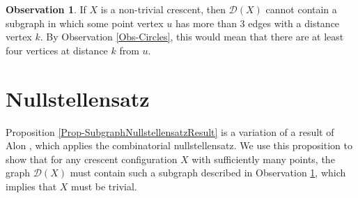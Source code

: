 \documentclass[12pt]{article}
\theoremstyle{definition}
\newtheorem{obs}{Observation}
\begin{document}
	\begin{obs}\label{Obs-BadSubgraph}
		If $X$ is a non-trivial crescent, then $\mathcal{D}(X)$ cannot contain a subgraph in which some point vertex $u$ has more than $3$ edges with a distance vertex $k$.  By Observation \ref{Obs-Circles}, this would mean that there are at least four vertices at distance $k$ from $u$.
	\end{obs}
	
	\section{Nullstellensatz}
	
	Proposition \ref{Prop-SubgraphNullstellensatzResult} is a variation of a result of Alon \cite{alon}, which applies the combinatorial nullstellensatz.  We use this proposition to show that for any crescent configuration $X$ with sufficiently many points, the graph $\mathcal{D}(X)$ must contain such a subgraph described in Observation \ref{Obs-BadSubgraph}, which implies that $X$ must be trivial.
	
\end{document}
